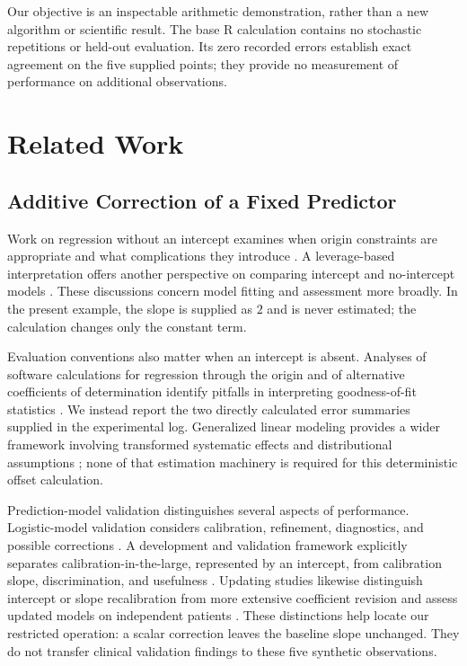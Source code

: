 \documentclass[11pt]{article}
\begin{document}
Our objective is an inspectable arithmetic demonstration, rather than a new algorithm or scientific result. The base R calculation contains no stochastic repetitions or held-out evaluation. Its zero recorded errors establish exact agreement on the five supplied points; they provide no measurement of performance on additional observations.

\section{Related Work}

\subsection{Additive Correction of a Fixed Predictor}

Work on regression without an intercept examines when origin constraints are appropriate and what complications they introduce \cite{Hahn1977FittingRegression,Eisenhauer2003RegressionThrough}. A leverage-based interpretation offers another perspective on comparing intercept and no-intercept models \cite{Casella1983LeverageRegression}. These discussions concern model fitting and assessment more broadly. In the present example, the slope is supplied as $2$ and is never estimated; the calculation changes only the constant term.

Evaluation conventions also matter when an intercept is absent. Analyses of software calculations for regression through the origin and of alternative coefficients of determination identify pitfalls in interpreting goodness-of-fit statistics \cite{Gordon1981ErrorsComputer,Kvlseth1985CautionaryNote}. We instead report the two directly calculated error summaries supplied in the experimental log. Generalized linear modeling provides a wider framework involving transformed systematic effects and distributional assumptions \cite{Nelder1972GeneralizedLinear}; none of that estimation machinery is required for this deterministic offset calculation.

Prediction-model validation distinguishes several aspects of performance. Logistic-model validation considers calibration, refinement, diagnostics, and possible corrections \cite{Miller1991ValidationTechniques}. A development and validation framework explicitly separates calibration-in-the-large, represented by an intercept, from calibration slope, discrimination, and usefulness \cite{Steyerberg2014TowardsBetter}. Updating studies likewise distinguish intercept or slope recalibration from more extensive coefficient revision and assess updated models on independent patients \cite{Steyerberg2004ValidationUpdating}. These distinctions help locate our restricted operation: a scalar correction leaves the baseline slope unchanged. They do not transfer clinical validation findings to these five synthetic observations.
\end{document}
